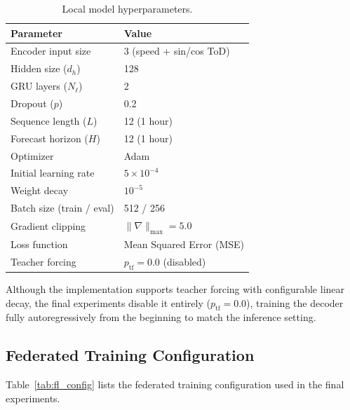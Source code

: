\begin{table}[H]
\centering
\caption{Local model hyperparameters.}
\label{tab:model_config}
\begin{tabular}{ll}
\hline
\textbf{Parameter} & \textbf{Value} \\
\hline
Encoder input size & 3 (speed + sin/cos ToD) \\
Hidden size ($d_h$) & 128 \\
GRU layers ($N_\ell$) & 2 \\
Dropout ($p$) & 0.2 \\
Sequence length ($L$) & 12 (1 hour) \\
Forecast horizon ($H$) & 12 (1 hour) \\
Optimizer & Adam \cite{kingma2015adam} \\
Initial learning rate & $5 \times 10^{-4}$ \\
Weight decay & $10^{-5}$ \\
Batch size (train / eval) & 512 / 256 \\
Gradient clipping & $\|\nabla\|_{\max} = 5.0$ \\
Loss function & Mean Squared Error (MSE) \\
Teacher forcing & $p_{\text{tf}} = 0.0$ (disabled) \\
\hline
\end{tabular}
\end{table}

Although the implementation supports teacher forcing with configurable linear decay, the final experiments disable it entirely ($p_{\text{tf}}=0.0$), training the decoder fully autoregressively from the beginning to match the inference setting.

\subsection{Federated Training Configuration}

Table~\ref{tab:fl_config} lists the federated training configuration used in the final experiments.

